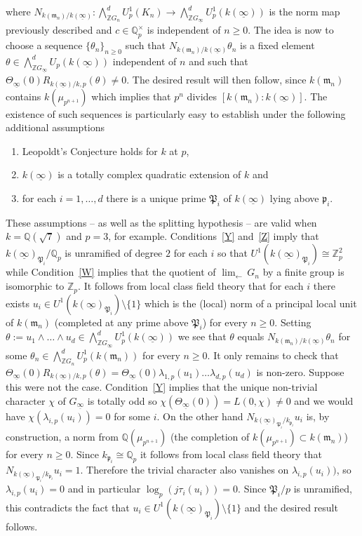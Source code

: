 \documentclass[12pt]{article}
\newcounter{example}[section]
\newcounter{rem}[section]%
\newcommand{\bbQ}{\ensuremath{\mathbb{Q}}}
\newcommand{\bbZ}{\ensuremath{\mathbb{Z}}}
\newcommand{\fm}{\ensuremath{\mathfrak{m}}}
\newcommand{\fp}{\ensuremath{\mathfrak{p}}}
\newcommand{\fP}{\ensuremath{\mathfrak{P}}}
\newcommand{\rem}{\refstepcounter{rem}\noindent{\sc Remark \therem}}%
\renewcommand{\therem}{\thesection.\arabic{rem}}
\newcommand{\uinf}{\ensuremath{{\underline{\infty}}}}
\begin{document}
where $N_{k(\fm_n)/k(\uinf)}:\bigwedge_{\bbZ G_n}^d U^1_p(K_n)\rightarrow
\bigwedge_{\bbZ G_{\uinf}}^d U^1_p(k(\uinf))$ is the norm map
previously described and $c\in \bbQ_p^\times$ is independent of $n\geq 0$. The idea is now to
choose a sequence $\{\theta_n\}_{n\geq 0}$ such that
$N_{k(\fm_n)/k(\uinf)}\theta_n$ is a fixed element $\theta\in
\bigwedge_{\bbZ G_{\uinf}}^d U_p(k(\uinf))$ independent
of $n$ and such that $\Theta_{\uinf}(0)R_{k(\uinf)/k,p}(\theta)\neq 0$.
The desired result will then follow,
since $k(\fm_n)$ contains $k(\mu_{p^{n+1}})$ which implies that $p^n$ divides
$[k(\fm_n):k(\uinf)]$. The existence of such sequences is particularly
easy to establish under the following additional assumptions
\begin{enumerate}
\item\label{W} Leopoldt's Conjecture holds for $k$ at $p$,
\item\label{Y} $k(\uinf)$ is a totally complex quadratic extension of $k$ and
\item\label{Z} for each $i=1,\ldots,d$ there is a unique prime $\fP_i$ of $k(\uinf)$ lying
above $\fp_i$.
\end{enumerate}
These assumptions -- as well as the splitting hypothesis -- are valid
when $k=\bbQ(\sqrt{7})$ and $p=3$, for example. Conditions~\ref{Y} and~\ref{Z}
imply that $k(\uinf)_{\fP_i}/\bbQ_p$ is unramified of degree $2$ for each $i$
so that $U^1(k(\uinf)_{\fP_i})\cong \bbZ_p^2$ while Condition~\ref{W} implies
that the quotient of ${\displaystyle\lim_\leftarrow}\,G_n$ by a finite group
is isomorphic to $\bbZ_p$.
It follows from local class field theory that for each $i$ there exists
$u_i\in U^1(k(\uinf)_{\fP_i})\setminus\{ 1\}$ which is the
(local) norm of a principal local unit of $k(\fm_n)$ (completed at any prime above $\fP_i$)
for every $n\geq 0$.
Setting $\theta:=u_1\wedge\ldots\wedge u_d\in\bigwedge_{\bbZ G_{\uinf}}^d U^1_p(k(\uinf))$
we see that $\theta$ equals $N_{k(\fm_n)/k(\uinf)}\theta_n$
for some $\theta_n\in\bigwedge_{\bbZ G_n}^d U^1_p(k(\fm_n))$ for every $n\geq 0$.
It only remains to check that
$\Theta_{\uinf}(0)R_{k(\uinf)/k,p}(\theta)=\Theta_{\uinf}(0)
\lambda_{1,p}(u_1)\ldots\lambda_{d,p}(u_d)$ is non-zero.
Suppose this were not the case.
Condition~\ref{Y} implies that the unique  non-trivial character $\chi$ of $G_\uinf$
is totally odd so
$\chi(\Theta_{\uinf}(0))=L(0,\chi)\neq 0$ and we would have $\chi(\lambda_{i,p}(u_i))=0$
for some $i$.
On the other hand  $N_{k(\uinf)_{\fP_i}/k_{\fp_i}}u_i$ is, by construction,
a norm from $\bbQ(\mu_{p^{n+1}})$ (the completion of $k(\mu_{p^{n+1}})\subset k(\fm_n)$)
for every $n\geq 0$. Since $k_{\fp_i}\cong\bbQ_p$ it follows from local class field theory
that $N_{k(\uinf)_{\fP_i}/k_{\fp_i}}u_i=1$. Therefore the trivial character also
vanishes on $\lambda_{i,p}(u_i))$, so $\lambda_{i,p}(u_i)=0$
and in particular $\log_p(j\tau_i(u_i))=0$.
Since $\fP_i/p$ is unramified, this contradicts the fact
that $u_i\in U^1(k(\uinf)_{\fP_i})\setminus\{ 1\}$ and the desired result follows.
\end{document}
